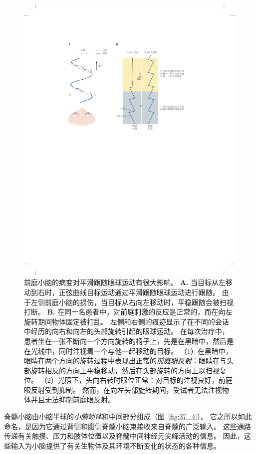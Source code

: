 \begin{figure}[htbp]
	\centering
	\includegraphics[width=0.85\linewidth]{chap37/fig_37_6}
	\caption{前庭小脑的病变对平滑跟随眼球运动有很大影响。
		\textbf{A.} 当目标从左移动到右时，正弦曲线目标运动通过平滑跟随眼球运动进行跟随。
		由于左侧前庭小脑的损伤，当目标从右向左移动时，平稳跟随会被扫视打断。
		\textbf{B.} 在同一名患者中，对前庭刺激的反应是正常的，而在向左旋转期间物体固定被打乱。
		左侧和右侧的痕迹显示了在不同的会话中经历的向右和向左的头部旋转引起的眼球运动。
		在每次治疗中，患者坐在一张不断向一个方向旋转的椅子上，先是在黑暗中，然后是在光线中，同时注视着一个与他一起移动的目标。
		（1）在黑暗中，眼睛在两个方向的旋转过程中表现出正常的\textit{前庭眼反射}：眼睛在与头部旋转相反的方向上平稳移动，然后在头部旋转的方向上以扫视复位。
		（2）光照下，头向右转时眼位正常：对目标的注视良好，前庭眼反射受到抑制。
		然而，在向左头部旋转期间，受试者无法注视物体并且无法抑制前庭眼反射。}
	\label{fig:37_6}
\end{figure}


脊髓小脑由小脑半球的\textit{小脑蚓体}和中间部分组成（图~\ref{fig:37_4}）。
它之所以如此命名，是因为它通过背侧和腹侧脊髓小脑束接收来自脊髓的广泛输入。
这些通路传递有关触摸、压力和肢体位置以及脊髓中间神经元尖峰活动的信息。
因此，这些输入为小脑提供了有关生物体及其环境不断变化的状态的各种信息。


